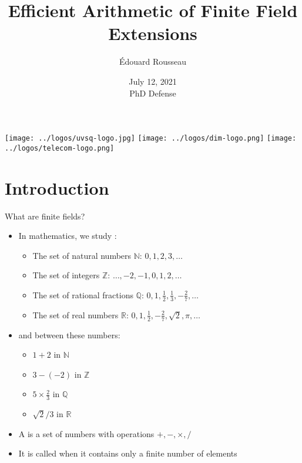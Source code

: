 \documentclass[xcolor=x11names,compress, aspectratio=43]{beamer}
\begin{document}
\begin{frame}
  \title{Efficient Arithmetic of Finite Field Extensions}
\author{Édouard Rousseau}
\date{July 12, 2021\\PhD Defense}
\titlepage
\begin{center}
    \texttt{[image: ../logos/uvsq-logo.jpg]}
    \hfill
    \texttt{[image: ../logos/dim-logo.png]}
    \hfill
    \texttt{[image: ../logos/telecom-logo.png]}
\end{center}
\end{frame}
\section{Introduction}

\begin{frame}{What are finite fields?}
  \begin{itemize}
    \item In mathematics, we study :
      \begin{itemize}
        \item The set of natural numbers $\mathbb{N}$: $0, 1, 2, 3, \dots$
        \item The set of integers $\mathbb{Z}$: $\dots, -2, -1, 0, 1, 2, \dots$
        \item The set of rational fractions $\mathbb{Q}$: $0, 1,
          \frac{1}{2}, \frac{1}{3}, -\frac{2}{7}, \dots$ 
        \item The set of real numbers $\mathbb{R}$: $0, 1, \frac{1}{2},
          -\frac{2}{7}, \sqrt 2, \pi, \dots$
      \end{itemize}
    \item and  between these numbers:
      \begin{itemize}
        \item $1+2$ \quad in $\mathbb{N}$
        \item $3-(-2)$ \quad in $\mathbb{Z}$
        \item $5\times \frac{2}{3}$ \quad in $\mathbb{Q}$
        \item $\sqrt 2/3$ \quad in $\mathbb{R}$
      \end{itemize}
    \item A  is a set of numbers with operations $+, -,
      \times, /$
    \item It is called  when it contains only a finite number of
      elements
  \end{itemize}
\end{frame}
\end{document}
